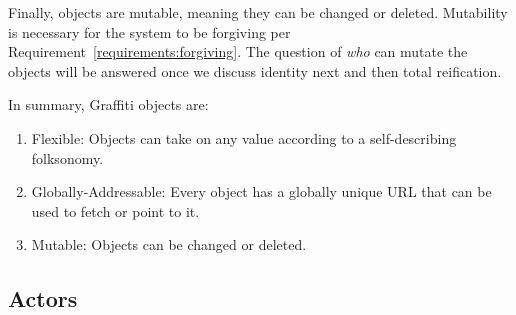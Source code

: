 Finally, objects are mutable, meaning they can be changed or deleted.
Mutability is necessary for the system to be forgiving per Requirement~\ref{requirements:forgiving}.
The question of \emph{who} can mutate the objects
will be answered once we discuss identity next and then total reification.

In summary, Graffiti objects are:

\begin{enumerate}
\item
Flexible: Objects can take on any value according to a self-describing folksonomy.
\item
Globally-Addressable: Every object has a globally unique URL that can be used to fetch or point to it.
\item
Mutable: Objects can be changed or deleted.
\end{enumerate}


\subsection{Actors}
\label{concepts:actors}

